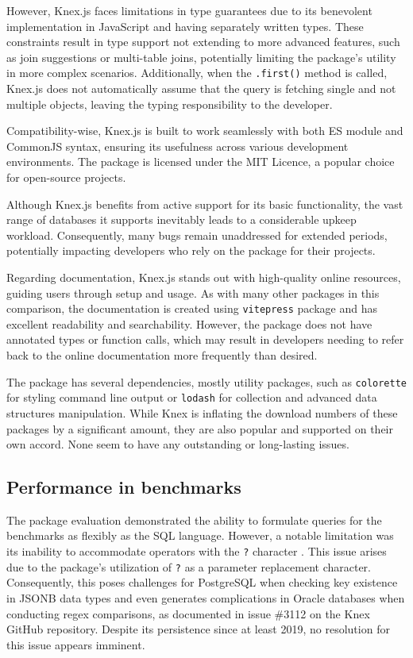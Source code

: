 However, Knex.js faces limitations in type guarantees due to its benevolent
implementation in JavaScript and having separately written types. These
constraints result in type support not extending to more advanced features, such
as join suggestions or multi-table joins, potentially limiting the package's
utility in more complex scenarios. Additionally, when the \texttt{.first()}
method is called, Knex.js does not automatically assume that the query is
fetching single and not multiple objects, leaving the typing responsibility to
the developer.

Compatibility-wise, Knex.js is built to work seamlessly with both ES module and
CommonJS syntax, ensuring its usefulness across various development
environments. The package is licensed under the MIT Licence, a popular choice
for open-source projects.

Although Knex.js benefits from active support for its basic functionality, the
vast range of databases it supports inevitably leads to a considerable upkeep
workload. Consequently, many bugs remain unaddressed for extended periods,
potentially impacting developers who rely on the package for their projects.

Regarding documentation, Knex.js stands out with high-quality online resources,
guiding users through setup and usage. As with many other packages in this
comparison, the documentation is created using \texttt{vitepress} package and
has excellent readability and searchability. However, the package does not have
annotated types or function calls, which may result in developers needing to
refer back to the online documentation more frequently than desired.

The package has several dependencies, mostly utility packages, such as
\texttt{colorette} for styling command line output or \texttt{lodash} for
collection and advanced data structures manipulation. While Knex is inflating
the download numbers of these packages by a significant amount, they are also
popular and supported on their own accord. None seem to have any outstanding or
long-lasting issues.

\subsection*{Performance in benchmarks}

The package evaluation demonstrated the ability to formulate queries for the
benchmarks as flexibly as the SQL language. However, a notable limitation was
its inability to accommodate operators with the \texttt{?} character
\cite{knexJSONIssue1}. This issue arises due to the package's utilization of
\texttt{?} as a parameter replacement character. Consequently, this poses
challenges for PostgreSQL when checking key existence in JSONB data types and
even generates complications in Oracle databases when conducting regex
comparisons, as documented in issue \#3112 \cite{knexJSONIssue2} on the Knex
GitHub repository. Despite its persistence since at least 2019, no resolution
for this issue appears imminent.

